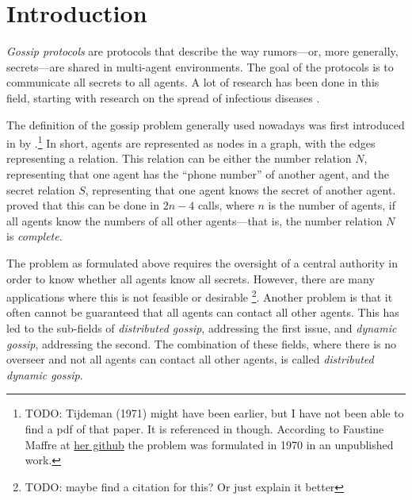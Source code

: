 
\section{Introduction}
\label{sec:introduction}

\textit{Gossip protocols} are protocols that describe the way rumors---or, more generally, secrets---are shared in multi-agent environments.
The goal of the protocols is to communicate all secrets to all agents.
A lot of research has been done in this field, 
starting with research on the spread of infectious diseases \parencite{kermack_contribution_1927}.

The definition of the gossip problem generally used nowadays was first introduced in \citeyear{hajnal_cure_1972} by \citeauthor{hajnal_cure_1972}.\footnote{TODO: Tijdeman (1971) might have been earlier, but I have not been able to find a pdf of that paper. It is referenced in \Textcite{van_ditmarsch_dynamic_2018} though. According to Faustine Maffre at \href{https://github.com/FaustineMaffre/GossipProblem-PDDL-generator}{her github} the problem was formulated in 1970 in an unpublished work.}
In short, agents are represented as nodes in a graph, with the edges representing a relation.
This relation can be either the number relation \(N\), representing that one agent has the ``phone number'' of another agent,
and the secret relation \(S\), representing that one agent knows the secret of another agent.
 proved that this can be done in \(2n-4\) calls, where \(n\) is the number of agents, if all agents know the numbers of all other agents---that is, the number relation \(N\) is \textit{complete}.

The problem as formulated above requires the oversight of a central authority in order to know whether all agents know all secrets.
However, there are many applications where this is not feasible or desirable \addcite \footnote{TODO: maybe find a citation for this? Or just explain it better}.
Another problem is that it often cannot be guaranteed that all agents can contact all other agents.
This has led to the sub-fields of \textit{distributed gossip}, addressing the first issue, and \textit{dynamic gossip}, addressing the second.
The combination of these fields, where there is no overseer and not all agents can contact all other agents, is called \textit{distributed dynamic gossip}.


